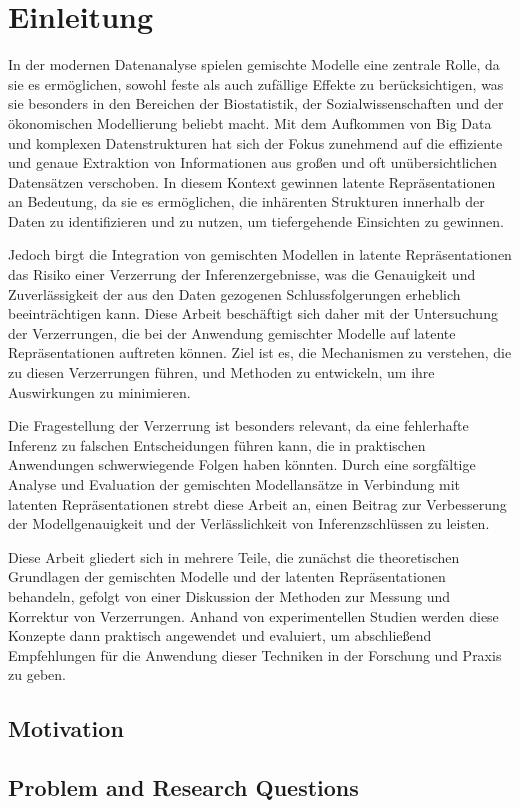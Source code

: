 \chapter{Einleitung}
\label{Chapter::Einleitung}

In der modernen Datenanalyse spielen gemischte Modelle eine zentrale Rolle, da sie es ermöglichen, sowohl feste als auch zufällige Effekte zu berücksichtigen, was sie besonders in den Bereichen der Biostatistik, der Sozialwissenschaften und der ökonomischen Modellierung beliebt macht. Mit dem Aufkommen von Big Data und komplexen Datenstrukturen hat sich der Fokus zunehmend auf die effiziente und genaue Extraktion von Informationen aus großen und oft unübersichtlichen Datensätzen verschoben. In diesem Kontext gewinnen latente Repräsentationen an Bedeutung, da sie es ermöglichen, die inhärenten Strukturen innerhalb der Daten zu identifizieren und zu nutzen, um tiefergehende Einsichten zu gewinnen.

Jedoch birgt die Integration von gemischten Modellen in latente Repräsentationen das Risiko einer Verzerrung der Inferenzergebnisse, was die Genauigkeit und Zuverlässigkeit der aus den Daten gezogenen Schlussfolgerungen erheblich beeinträchtigen kann. Diese Arbeit beschäftigt sich daher mit der Untersuchung der Verzerrungen, die bei der Anwendung gemischter Modelle auf latente Repräsentationen auftreten können. Ziel ist es, die Mechanismen zu verstehen, die zu diesen Verzerrungen führen, und Methoden zu entwickeln, um ihre Auswirkungen zu minimieren.

Die Fragestellung der Verzerrung ist besonders relevant, da eine fehlerhafte Inferenz zu falschen Entscheidungen führen kann, die in praktischen Anwendungen schwerwiegende Folgen haben könnten. Durch eine sorgfältige Analyse und Evaluation der gemischten Modellansätze in Verbindung mit latenten Repräsentationen strebt diese Arbeit an, einen Beitrag zur Verbesserung der Modellgenauigkeit und der Verlässlichkeit von Inferenzschlüssen zu leisten.

Diese Arbeit gliedert sich in mehrere Teile, die zunächst die theoretischen Grundlagen der gemischten Modelle und der latenten Repräsentationen behandeln, gefolgt von einer Diskussion der Methoden zur Messung und Korrektur von Verzerrungen. Anhand von experimentellen Studien werden diese Konzepte dann praktisch angewendet und evaluiert, um abschließend Empfehlungen für die Anwendung dieser Techniken in der Forschung und Praxis zu geben.
\section{Motivation}
\label{Section::Motivation}
  
\section{Problem and Research Questions}
\label{Section::Problem_and_Research_Questions}


